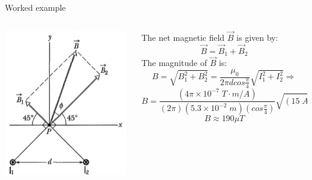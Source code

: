 {\begin{frame}{Worked example}
\begin{columns}
  \begin{column}{0.32\textwidth}
    \begin{center}
      \includegraphics[width=0.98\textwidth]{./images/problems/lect5_Bfield_2wires_2.png}\\
    \end{center}
  \end{column}
  \begin{column}{0.68\textwidth}
    {\small
          The net magnetic field  $\vec{B}$ is given by:
          \begin{equation*}
             \vec{B} = \vec{B}_1 + \vec{B}_2
         \end{equation*}
          The magnitude of  $\vec{B}$ is:
          \begin{equation*}
             B = \sqrt{B_1^2 + B_2^2} =
                   \frac{\mu_0}{2\pi d cos\frac{\pi}{4}}
                   \sqrt {I_1^2 + I_2^2} \Rightarrow
         \end{equation*}
          \begin{equation*}
             B = \frac{(4\pi \times 10^{-7} \; T \cdot m/A)}
                           {(2\pi) (5.3\times 10^{-2} \; m) (cos\frac{\pi}{4})}
                            \sqrt{(15\;A)^2 + (32\;A)^2} \Rightarrow
         \end{equation*}
          \begin{equation*}
             B \approx 190 {\mu}T
         \end{equation*}
    }
  \end{column}
\end{columns}


\end{frame}}
